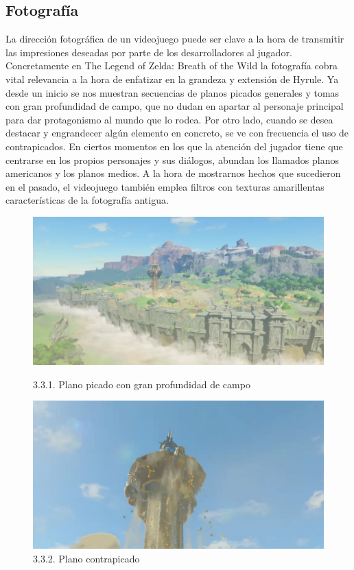 \documentclass[12pt]{article}
\begin{document}
\subsection{Fotografía}

La dirección fotográfica de un videojuego puede ser clave a la hora de transmitir las impresiones deseadas por parte de los desarrolladores al jugador. Concretamente en The Legend of Zelda: Breath of the Wild la fotografía cobra vital relevancia a la hora de enfatizar en la grandeza y extensión de Hyrule.
Ya desde un inicio se nos muestran secuencias de planos picados generales y tomas con gran profundidad de campo, que no dudan en apartar al personaje principal para dar protagonismo al mundo que lo rodea. Por otro lado, cuando se desea destacar y engrandecer algún elemento en concreto, se ve con frecuencia el uso de contrapicados.
En ciertos momentos en los que la atención del jugador tiene que centrarse en los propios personajes y sus diálogos, abundan los llamados planos americanos y los planos medios.
A la hora de mostrarnos hechos que sucedieron en el pasado, el videojuego también emplea filtros con texturas amarillentas características de la fotografía antigua.

\begin{figure}[H]
  \centering
  \begin{minipage}{0.4\textwidth}
    \includegraphics[width=\textwidth]{images/general images/Fotografia/Plano picado con gran profundidad de campo.png}
    \caption{3.3.1. Plano picado con gran profundidad de campo}
  \end{minipage}
  \hfill
  \begin{minipage}{0.4\textwidth}
    \includegraphics[width=\textwidth]{images/general images/Fotografia/Plano contrapicado.png}
    \caption{3.3.2. Plano contrapicado}
  \end{minipage}
\end{figure}
\end{document}
